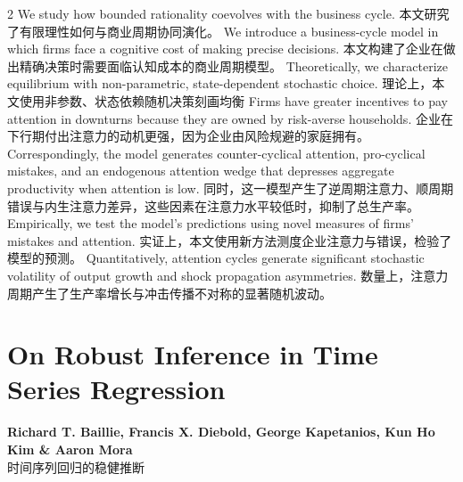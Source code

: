 \documentclass[cn,hazy,blue,14pt,screen]{elegantnote}
\begin{document}
\begin{paracol}{2}
	We study how bounded rationality coevolves with the business cycle. 
	\switchcolumn
	本文研究了有限理性如何与商业周期协同演化。
	\switchcolumn*
	We introduce a business-cycle model in which firms face a cognitive cost of making precise decisions. 
	\switchcolumn
	本文构建了企业在做出精确决策时需要面临认知成本的商业周期模型。
	\switchcolumn*
	Theoretically, we characterize equilibrium with non-parametric, state-dependent stochastic choice. 
	\switchcolumn
	理论上，本文使用非参数、状态依赖随机决策刻画均衡
	\switchcolumn*
	Firms have greater incentives to pay attention in downturns because they are owned by risk-averse households. 
	\switchcolumn
	企业在下行期付出注意力的动机更强，因为企业由风险规避的家庭拥有。
	\switchcolumn*
	Correspondingly, the model generates counter-cyclical attention, pro-cyclical mistakes, and an endogenous attention wedge that depresses aggregate productivity when attention is low. 
	\switchcolumn
	同时，这一模型产生了逆周期注意力、顺周期错误与内生注意力差异，这些因素在注意力水平较低时，抑制了总生产率。
	\switchcolumn*
	Empirically, we test the model's predictions using novel measures of firms' mistakes and attention.
	\switchcolumn
	实证上，本文使用新方法测度企业注意力与错误，检验了模型的预测。
	\switchcolumn*
	Quantitatively, attention cycles generate significant stochastic volatility of output growth and shock propagation asymmetries.
	\switchcolumn
	数量上，注意力周期产生了生产率增长与冲击传播不对称的显著随机波动。
	
\end{paracol}

\section{On Robust Inference in Time Series Regression}
\begin{center}
	\textbf{Richard T. Baillie, Francis X. Diebold, George Kapetanios, Kun Ho Kim \& Aaron Mora}\\
	时间序列回归的稳健推断
\end{center}
\end{document}
